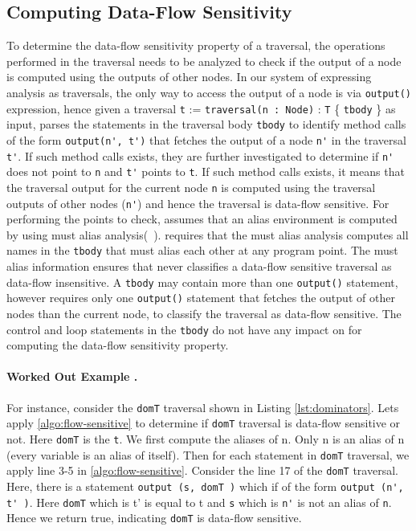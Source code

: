 

\subsection{Computing Data-Flow Sensitivity}
\label{sec:df-algo}
To determine the data-flow sensitivity property of a traversal, the operations
performed in the traversal needs to be analyzed to check if the output of a
node is computed using the outputs of other nodes. In our system of expressing
analysis as traversals, the only way to access the output of a node is via
\lstinline|output()| expression, hence given a traversal \lstinline|t| :=
\lstinline|traversal(n : Node)| :
\lstinline|T| \{ \lstinline|tbody| \} as input, 
parses the statements in the traversal body \lstinline|tbody| to identify method
calls of the form \lstinline|output(n', t')| that fetches the output of a node
\lstinline|n'| in the traversal \lstinline|t'|. If such method calls exists,
they are further investigated to determine if \lstinline|n'| does not point to
\lstinline|n| and \lstinline|t'| points to \lstinline|t|.
If such method calls exists, it means that the traversal output for the current
node \lstinline|n| is computed using the traversal outputs of other nodes
(\lstinline|n'|) and hence the traversal is data-flow sensitive.
For performing the points to check,  assumes that
an alias environment is computed by using must alias
analysis(~\cite{must-alias}).  requires that
the must alias analysis computes all names in the \lstinline|tbody| that must
alias each other at any program point. The must alias information ensures that
 never classifies a data-flow sensitive traversal
as data-flow insensitive.
A \lstinline|tbody| may contain more than one \lstinline|output()| statement,
however  requires only one \lstinline|output()|
statement that fetches the output of other nodes than the current node, to
classify the traversal as data-flow sensitive. The control and loop statements
in the \lstinline|tbody| do not have any impact on 
for computing the data-flow sensitivity property.

\paragraph{Worked Out Example .}
For instance, consider the \lstinline|domT| traversal shown in Listing \ref{lst:dominators}. Lets apply \ref{algo:flow-sensitive} to determine if \lstinline|domT| traversal is data-flow sensitive or not. Here \lstinline|domT| is the \lstinline|t|. We first compute the aliases of n. Only n is an alias of n (every variable is an alias of itself). Then for each statement in \lstinline|domT| traversal, we apply line 3-5 in \ref{algo:flow-sensitive}. Consider the line 17 of the \lstinline|domT| traversal. Here, there is a statement \lstinline|output (s, domT )| which if of the form \lstinline|output (n', t' )|. Here \lstinline|domT| which is t' is equal to t and \lstinline|s| which is \lstinline|n'| is not an alias of \lstinline|n|. Hence we return true, indicating \lstinline|domT| is data-flow sensitive.

